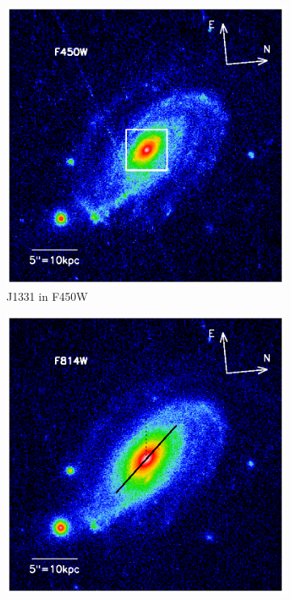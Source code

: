 \begin{figure}
\centering
\begin{subfigure}{.5\textwidth}
  \centering
  \includegraphics[width=.9\linewidth]{fig/first_glimpse_450.ps}
  \caption{J1331 in F450W}
  \label{fig:F450W}
\end{subfigure}%
\begin{subfigure}{.5\textwidth}
  \centering
  \includegraphics[width=.9\linewidth]{fig/first_glimpse_814.ps}

\end{subfigure}
\end{figure}
